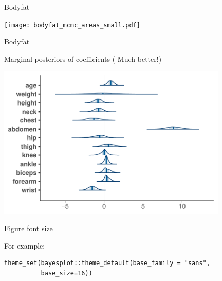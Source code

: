 \documentclass[english,t]{beamer}
\begin{document}
\begin{frame}
  
  {\Large\color{navyblue} Bodyfat}

  
  \texttt{[image: bodyfat\_mcmc\_areas\_small.pdf]}

\end{frame}

\begin{frame}
  
  {\Large\color{navyblue} Bodyfat}

  Marginal posteriors of coefficients ({\color{red} Much better!})
  
  \includegraphics[width=11cm]{bodyfat_mcmc_areas.pdf}

\end{frame}

\begin{frame}[fragile]
  
  {\Large\color{navyblue} Figure font size}

For example:
  
  {\footnotesize
\begin{lstlisting}
theme_set(bayesplot::theme_default(base_family = "sans",
          base_size=16))
\end{lstlisting}
  }

\end{frame}
\end{document}
